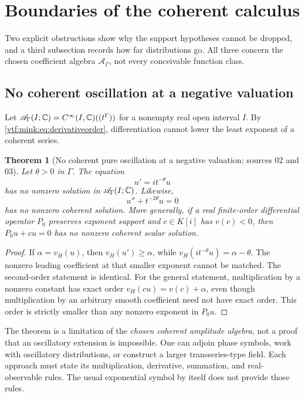 \documentclass[11pt,letterpaper]{article}
\newtheorem{theorem}{Theorem}[section]
\theoremstyle{definition}
\theoremstyle{remark}
\newcommand{\A}{\mathscr A}\newcommand{\OO}{\mathcal O}\newcommand{\mm}{\mathfrak m}
\newcommand{\vH}{v_{\!H}}
\begin{document}
\section{Boundaries of the coherent calculus}\label{vtf:sec:boundaries}

Two explicit obstructions show why the support hypotheses cannot be dropped, and
a third subsection records how far distributions go. All three concern the chosen
coefficient algebra $\A_\Gamma$, not every conceivable function class.

\subsection{No coherent oscillation at a negative valuation}

Let $\A_\Gamma(I;\C)=C^\infty(I,\C)((t^\Gamma))$ for a nonempty real open
interval $I$. By \eqref{vtf:mink:eq:derivativeorder}, differentiation cannot
lower the least exponent of a coherent series.

\begin{theorem}[No coherent pure oscillation at a negative valuation; sources 02 and 03]\label{vtf:mink:thm:highfrequency}
Let $\theta>0$ in $\Gamma$. The equation
\begin{equation}\label{vtf:mink:eq:highfreq}
 u'=it^{-\theta}u
\end{equation}
has no nonzero solution in $\A_\Gamma(I;\C)$. Likewise,
\begin{equation}
 u''+t^{-2\theta}u=0
\end{equation}
has no nonzero coherent solution. More generally, if a real finite-order differential operator $P_0$ preserves exponent support and $c\in K[i]$ has $v(c)<0$, then $P_0u+cu=0$ has no nonzero coherent scalar solution.
\end{theorem}
\begin{proof}
If $\alpha=\vH(u)$, then $\vH(u')\geq\alpha$, while
$\vH(it^{-\theta}u)=\alpha-\theta$. The nonzero leading coefficient at that smaller exponent cannot be matched. The second-order statement is identical. For the general statement, multiplication by a nonzero constant has exact order $\vH(cu)=v(c)+\alpha$, even though multiplication by an arbitrary smooth coefficient need not have exact order. This order is strictly smaller than any nonzero exponent in $P_0u$.
\end{proof}

The theorem is a limitation of the \emph{chosen coherent amplitude algebra}, not a proof that an oscillatory extension is impossible. One can adjoin phase symbols, work with oscillatory distributions, or construct a larger transseries-type field. Each approach must state its multiplication, derivative, summation, and real-observable rules. The usual exponential symbol by itself does not provide those rules.
\end{document}
